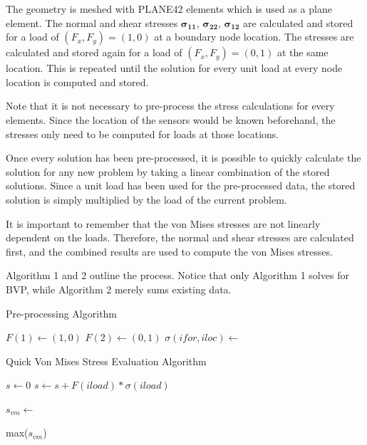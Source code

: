 \documentclass[letterpaper,12pt,]{article}
\begin{document}
The geometry is meshed with PLANE42 elements which is used as a plane element. The normal and shear stresses $\boldsymbol{\sigma_{11}}$, $\boldsymbol{\sigma_{22}}$, $\boldsymbol{\sigma_{12}}$ are calculated and stored for a load of $(F_x,F_y) = (1, 0)$ at a boundary node location. The stresses are calculated and stored again for a load of $(F_x,F_y) = (0, 1)$ at the same location. This is repeated until the solution for every unit load at every node location is computed and stored.

Note that it is not necessary to pre-process the stress calculations for every elements. Since the location of the sensors would be known beforehand, the stresses only need to be computed for loads at those locations.

Once every solution has been pre-processed, it is possible to quickly calculate the solution for any new problem by taking a linear combination of the stored solutions. Since a unit load has been used for the pre-processed data, the stored solution is simply multiplied by the load of the current problem. 

It is important to remember that the von Mises stresses are not linearly dependent on the loads. Therefore, the normal and shear stresses are calculated first, and the combined results are used to compute the von Mises stresses.

Algorithm 1 and 2 outline the process. Notice that only Algorithm 1 solves for BVP, while Algorithm 2 merely sums existing data.

\begin{algorithm}
\caption{Pre-processing Algorithm}\label{pproc}
\begin{algorithmic}[1]
\State {}
\State $F(1) \gets (1,0)$
\State $F(2) \gets (0,1)$
 
  \State {}
  \State $\sigma(ifor,iloc) \gets $  
  \State {}
\EndFor
\EndFor
\end{algorithmic}
\end{algorithm}


\begin{algorithm}
\caption{Quick Von Mises Stress Evaluation Algorithm}\label{VMalg}
\begin{algorithmic}[1]
\State {}
\State {}

\State $s\gets 0$
  \State $s \gets s + F(iload) * \sigma(iload)$ 
\EndFor

\State $s_{vm} \gets $ 

\State \Return max($s_{vm}$)

\end{algorithmic}
\end{algorithm}
\end{document}
